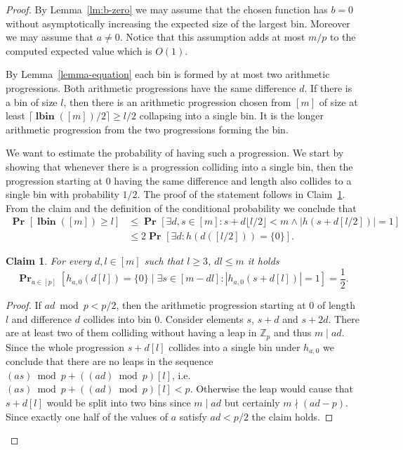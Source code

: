 \documentclass{article}
\newcommand{\vlbin}[1]{\operatorname{\mathbf{lbin}}({#1})}
\newcommand{\probs}[2]{\operatorname{\mathbf{Pr}}_{{#1}}\left[{#2}\right]}
\newcommand{\prob}[1]{\probs{}{#1}}
\newtheorem{claim}{Claim}
\begin{document}
\begin{proof}
By Lemma~\ref{lm:b-zero} we may assume that the chosen function has $b = 0$ without asymptotically increasing the expected size of the largest bin. 
Moreover we may assume that $a \neq 0$. 
Notice that this assumption adds at most $m/p$ to the computed expected value which is $O(1)$.

By Lemma~\ref{lemma-equation} each bin is formed by at most two arithmetic progressions. Both arithmetic progressions have the same difference $d$.
If there is a bin of size $l$, then there is an arithmetic progression chosen from $[m]$ of size at least $\lceil \vlbin{[m]}/2 \rceil \geq l/2$ collapsing into a single bin.
It is the longer arithmetic progression from the two progressions forming the bin.

We want to estimate the probability of having such a progression.
We start by showing that whenever there is a progression colliding into a single bin, then the progression starting at $0$ having the same difference and length also collides to a single bin with probability $1/2$.
The proof of the statement follows in Claim~\ref{claim-normalize-progression}. From the claim and the definition of the conditional probability we conclude that 
\begin{align*}
\prob{\vlbin{[m]} \geq l} & \leq \prob{\exists d, s \in [m] \colon s+d\lfloor l/2 \rfloor < m \wedge |h(s + d[l/2])| = 1} \\
	& \leq 2 \prob{\exists d \colon h(d([l/2])) = \{0\}}.
\end{align*}

\begin{claim}
\label{claim-normalize-progression}
For every $d, l \in [m]$ such that $l \geq 3$, $dl \leq m$ it holds 
\[\probs{a\in[p]}{h_{a,0}(d[l]) = \{0\} \mid \exists s \in [m - dl]\colon |h_{a,0}(s + d[l])| = 1} = \frac{1}{2}.\]
\end{claim}
\begin{proof}
If $ad \bmod p < p/2$, then the arithmetic progression starting at $0$ of length $l$ and difference $d$ collides into bin $0$. 
Consider elements $s$, $s + d$ and $s + 2d$.
There are at least two of them colliding without having a leap in $\mathbb{Z}_p$ and thus $m \mid ad$.
Since the whole progression $s + d[l]$ collides into a single bin under $h_{a,0}$ we conclude that there are no leaps in the sequence $(as) \bmod p + ((ad) \bmod p)[l]$, i.e. $(as) \bmod p + ((ad) \bmod p)[l] < p$.
Otherwise the leap would cause that $s + d[l]$ would be split into two bins since $m \mid ad$ but certainly $m \nmid (ad - p)$.
Since exactly one half of the values of $a$ satisfy $ad < p/2$ the claim holds.


\end{proof}
\end{proof}
\end{document}
